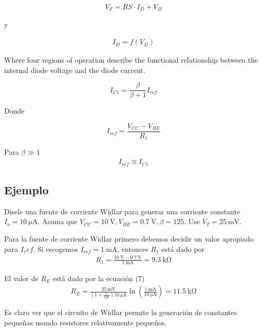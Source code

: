 \documentclass[12pt]{article}
\begin{document}
	\begin{align}
		V_F = RS \cdot I_D + V_D
	\end{align}

	\noindent y
	
	\begin{align}
		I_D = f(V_D)
	\end{align}
	
	\noindent Where four regions of operation describe the functional relationship between the internal diode voltage and the diode current.
	
	\begin{tcolorbox}[colback=red!5!white,colframe=red!75!black,arc=0mm,boxrule=0mm,width=(\linewidth+0.5cm)]
		\begin{equation}
			I_{C1} = \frac{\beta}{\beta + 1}I_{ref}
		\end{equation}
	\end{tcolorbox}
	
	\noindent Donde
	\begin{tcolorbox}[colback=red!5!white,colframe=red!75!black,arc=0mm,boxrule=0mm,width=(\linewidth+0.5cm)]
		\begin{equation}
			I_{ref} = \frac{V_{CC} - V_{BE}}{R_1}
		\end{equation}
	\end{tcolorbox}
	
	\noindent Para $\beta \gg 1$
	\begin{align}
		I_{ref} \cong I_{C1}
	\end{align}
	
	\subsection*{Ejemplo}
	Disele una fuente de corriente Widlar para generar una corriente constante $I_o = \SI{10}{\micro\ampere}$. Asuma que $V_{CC} = \SI{10}{\volt}, V_{BE} = \SI{0.7}{\volt}, \beta=125$. Use $V_T = \SI{25}{\milli\volt}$.
	
	
	\noindent Para la fuente de corriente Widlar primero debemos decidir un valor apropiado para $I_ref$. Si escogemos $I_{ref} = \SI{1}{\milli\ampere}$, entonces $R_1$ está dado por
	\begin{align}
		R_1 = \frac{\SI{10}{\volt} - \SI{0.7}{\volt}}{\SI{1}{\milli\ampere}} = \SI{9.3}{\kilo\ohm}
	\end{align}
	
	\noindent El valor de $R_E$ está dado por la ecuación (7)
	\begin{align}
		R_E = \frac{\SI{25}{\milli\volt}}{\left(1 + \frac{1}{125}\right)\SI{10}{\micro\ampere}}\ln \left( \frac{\SI{1}{\milli\ampere}}{\SI{10}{\micro\ampere}} \right) = \SI{11.5}{\kilo\ohm}
	\end{align}
	
	\noindent Es claro ver que el circuito de Widlar permite la generación de constantes pequeñas usando resistores relativamente pequeños.
\end{document}
